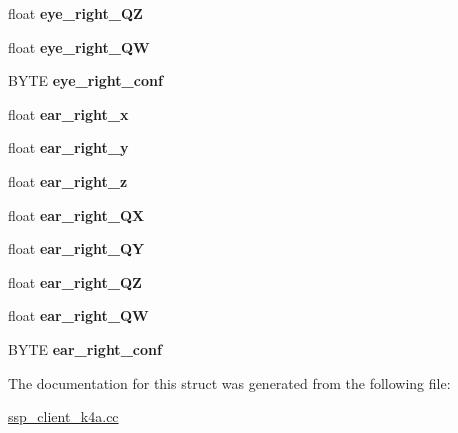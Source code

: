 \begin{DoxyCompactItemize}
float {\bfseries eye\+\_\+right\+\_\+\+QZ}
\item 
\mbox{\label{struct__custom__k4abt__body__t_a9fa427612143840f95a3d0cf07eb4ef3}} 
float {\bfseries eye\+\_\+right\+\_\+\+QW}
\item 
\mbox{\label{struct__custom__k4abt__body__t_ace49475f63a86c13e816ffc567cc2a88}} 
B\+Y\+TE {\bfseries eye\+\_\+right\+\_\+conf}
\item 
\mbox{\label{struct__custom__k4abt__body__t_a0eb1aa67fbf8db9ff8051510fce54846}} 
float {\bfseries ear\+\_\+right\+\_\+x}
\item 
\mbox{\label{struct__custom__k4abt__body__t_a3a7ca3bf107db86fc07963691d5f3a2c}} 
float {\bfseries ear\+\_\+right\+\_\+y}
\item 
\mbox{\label{struct__custom__k4abt__body__t_a2c441ad5c200a96673f286ea95c0c54e}} 
float {\bfseries ear\+\_\+right\+\_\+z}
\item 
\mbox{\label{struct__custom__k4abt__body__t_aaf74c097703a365cbe5f5c7cd9c61a4e}} 
float {\bfseries ear\+\_\+right\+\_\+\+QX}
\item 
\mbox{\label{struct__custom__k4abt__body__t_af3b8a7f837087d8ef0b5aa27a17b5b1b}} 
float {\bfseries ear\+\_\+right\+\_\+\+QY}
\item 
\mbox{\label{struct__custom__k4abt__body__t_afeeea93b2eee7c4a87deb8a73d237cd7}} 
float {\bfseries ear\+\_\+right\+\_\+\+QZ}
\item 
\mbox{\label{struct__custom__k4abt__body__t_a733ae59e9418131494432e1df66b8fb5}} 
float {\bfseries ear\+\_\+right\+\_\+\+QW}
\item 
\mbox{\label{struct__custom__k4abt__body__t_aa97079e5c72c2b338c1a6933bfe9059a}} 
B\+Y\+TE {\bfseries ear\+\_\+right\+\_\+conf}
\end{DoxyCompactItemize}


The documentation for this struct was generated from the following file\+:\begin{DoxyCompactItemize}
\item 
\hyperlink{ssp__client__k4a_8cc}{ssp\+\_\+client\+\_\+k4a.\+cc}\end{DoxyCompactItemize}
